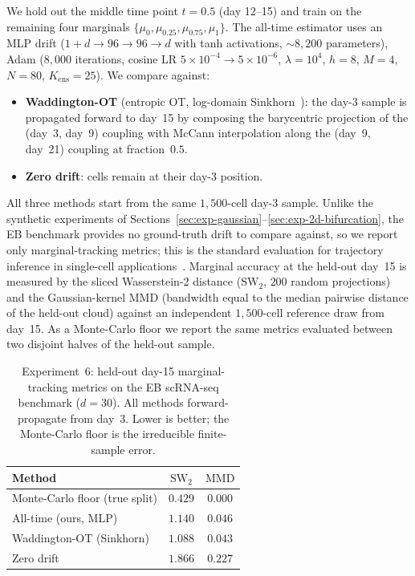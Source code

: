 \documentclass[11pt,leqno]{article}
\theoremstyle{plain}
\theoremstyle{remark}
\theoremstyle{definition}
\numberwithin{equation}{section}
\numberwithin{figure}{section}
\numberwithin{table}{section}
\begin{document}
We hold out the middle time point $t=0.5$ (day 12--15) and train
on the remaining four marginals
$\{\mu_0,\mu_{0.25},\mu_{0.75},\mu_1\}$.  The all-time estimator
uses an MLP drift ($1{+}d\to 96\to 96\to d$ with tanh activations,
${\sim}8{,}200$ parameters), Adam ($8{,}000$ iterations, cosine LR
$5\!\times\!10^{-4}\to 5\!\times\!10^{-6}$, $\lambda=10^{4}$,
$h=8$, $M=4$, $N=80$, $K_{\mathrm{ens}}=25$).  We compare against:
\begin{itemize}
  \item \textbf{Waddington-OT} (entropic OT, log-domain
        Sinkhorn~\cite{Cuturi2013}): the day-3 sample is propagated
        forward to day~15 by composing the barycentric projection of
        the (day~3, day~9) coupling with McCann interpolation along
        the (day~9, day~21) coupling at fraction~$0.5$.
  \item \textbf{Zero drift}: cells remain at their day-3 position.
\end{itemize}
All three methods start from the same $1{,}500$-cell day-3 sample.
Unlike the synthetic experiments of
Sections~\ref{sec:exp-gaussian}--\ref{sec:exp-2d-bifurcation}, the
EB benchmark provides no ground-truth drift to compare against, so
we report only marginal-tracking metrics; this is the standard
evaluation for trajectory inference in single-cell
applications~\cite{Schiebinger2019}.
Marginal accuracy at the held-out day~15 is measured by the
sliced Wasserstein-2 distance ($\mathrm{SW}_2$, $200$ random
projections) and the Gaussian-kernel MMD (bandwidth equal to the
median pairwise distance of the held-out cloud) against an
independent $1{,}500$-cell reference draw from day~15.  As a
Monte-Carlo floor we report the same metrics evaluated between two
disjoint halves of the held-out sample.

\begin{table}[htbp]
\centering
\caption{Experiment~6: held-out day-15 marginal-tracking metrics on
the EB scRNA-seq benchmark ($d=30$).  All methods forward-propagate
from day~3.  Lower is better; the Monte-Carlo floor is the irreducible
finite-sample error.}
\label{tab:exp-eb}
\begin{tabular}{lcc}
\toprule
Method                         & $\mathrm{SW}_2$ & $\mathrm{MMD}$ \\
\midrule
Monte-Carlo floor (true split) & $0.429$         & $0.000$        \\
All-time (ours, MLP)           & $1.140$         & $0.046$        \\
Waddington-OT (Sinkhorn)       & $1.088$         & $0.043$        \\
Zero drift                     & $1.866$         & $0.227$        \\
\bottomrule
\end{tabular}
\end{table}
\end{document}

